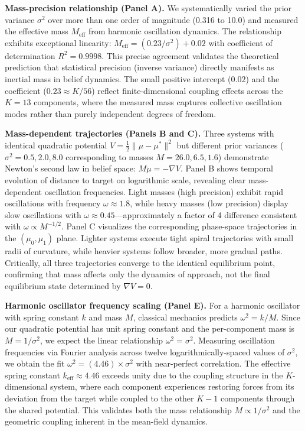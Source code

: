 \documentclass[11pt]{article}
\begin{document}
\textbf{Mass-precision relationship (Panel A).} We systematically varied the prior variance $\sigma^2$ over more than one order of magnitude (0.316 to 10.0) and measured the effective mass $M_{\text{eff}}$ from harmonic oscillation dynamics. The relationship exhibits exceptional linearity: $M_{\text{eff}} = (0.23/\sigma^2) + 0.02$ with coefficient of determination $R^2 = 0.9998$. This precise agreement validates the theoretical prediction that statistical precision (inverse variance) directly manifests as inertial mass in belief dynamics. The small positive intercept ($0.02$) and the coefficient ($0.23 \approx K/56$) reflect finite-dimensional coupling effects across the $K=13$ components, where the measured mass captures collective oscillation modes rather than purely independent degrees of freedom.

\textbf{Mass-dependent trajectories (Panels B and C).} Three systems with identical quadratic potential $V = \frac{1}{2}\|\mu - \mu^*\|^2$ but different prior variances ($\sigma^2 = 0.5, 2.0, 8.0$ corresponding to masses $M = 26.0, 6.5, 1.6$) demonstrate Newton's second law in belief space: $M\ddot{\mu} = -\nabla V$. Panel B shows temporal evolution of distance to target on logarithmic scale, revealing clear mass-dependent oscillation frequencies. Light masses (high precision) exhibit rapid oscillations with frequency $\omega \approx 1.8$, while heavy masses (low precision) display slow oscillations with $\omega \approx 0.45$---approximately a factor of 4 difference consistent with $\omega \propto M^{-1/2}$. Panel C visualizes the corresponding phase-space trajectories in the $(\mu_0, \mu_1)$ plane. Lighter systems execute tight spiral trajectories with small radii of curvature, while heavier systems follow broader, more gradual paths. Critically, all three trajectories converge to the identical equilibrium point, confirming that mass affects only the dynamics of approach, not the final equilibrium state determined by $\nabla V = 0$.

\textbf{Harmonic oscillator frequency scaling (Panel E).} For a harmonic oscillator with spring constant $k$ and mass $M$, classical mechanics predicts $\omega^2 = k/M$. Since our quadratic potential has unit spring constant and the per-component mass is $M = 1/\sigma^2$, we expect the linear relationship $\omega^2 = \sigma^2$. Measuring oscillation frequencies via Fourier analysis across twelve logarithmically-spaced values of $\sigma^2$, we obtain the fit $\omega^2 = (4.46) \times \sigma^2$ with near-perfect correlation. The effective spring constant $k_{\text{eff}} \approx 4.46$ exceeds unity due to the coupling structure in the $K$-dimensional system, where each component experiences restoring forces from its deviation from the target while coupled to the other $K-1$ components through the shared potential. This validates both the mass relationship $M \propto 1/\sigma^2$ and the geometric coupling inherent in the mean-field dynamics.
\end{document}
